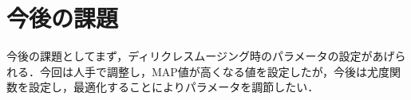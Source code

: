 \section{今後の課題}
今後の課題としてまず，ディリクレスムージング時のパラメータの設定があげられる．今回は人手で調整し，MAP値が高くなる値を設定したが，今後は尤度関数を設定し，最適化することによりパラメータを調節したい．




